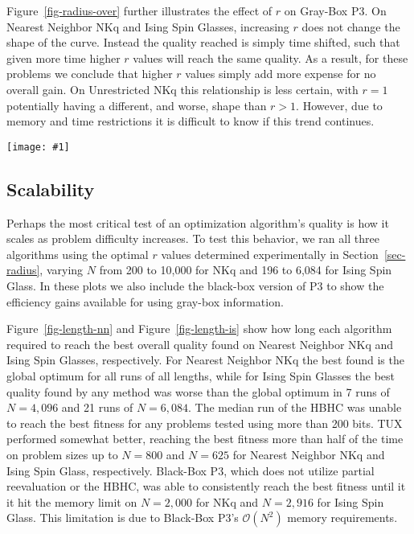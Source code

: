 \documentclass{sig-alternate}
\newcommand{\includegraphicswide}[1]
{\texttt{[image: \#1]}}
\newcommand{\BigO}[1]{$\mathcal{O}{(#1)}$}
\begin{document}
Figure~\ref{fig-radius-over} further illustrates the effect of $r$ on Gray-Box P3. On Nearest Neighbor NKq
and Ising Spin Glasses, increasing $r$ does not change the shape of the curve. Instead the quality reached is simply time shifted,
such that given more time higher $r$ values will reach the same quality. As a result, for these problems we conclude
that higher $r$ values simply add more expense for no overall gain.
On Unrestricted NKq this relationship is less certain, with $r=1$ potentially having a different, and worse, shape than $r>1$.
However, due to memory and time restrictions it is difficult to know if this trend continues.

\begin{figure*}
  \centering
  \includegraphicswide{radius-over}
  \caption{Comparison of Gray-Box P3's solution quality during optimization on a log-log scale for different $r$ values.
  For NKq-Landscapes $N=6,000$ and $K=4$ and for Ising Spin Glasses $N=6,084$.}
  \label{fig-radius-over}
\end{figure*}

\subsection{Scalability}
Perhaps the most critical test of an optimization algorithm's quality is
how it scales as problem difficulty increases. To test this behavior,
we ran all three algorithms using the optimal $r$ values determined experimentally in Section~\ref{sec-radius},
varying $N$ from 200 to 10,000 for NKq and 196 to 6,084 for Ising Spin Glass.
In these plots we also include the black-box version of P3 to show the efficiency
gains available for using gray-box information.


Figure~\ref{fig-length-nn} and Figure~\ref{fig-length-is} show how long each
algorithm required to reach the best overall quality found on Nearest Neighbor NKq
and Ising Spin Glasses, respectively. For Nearest Neighbor NKq the best found
is the global optimum for all runs of all lengths, while for Ising Spin Glasses
the best quality found by any method was worse than the global optimum in 7 runs of
$N=4,096$ and 21 runs of $N=6,084$. The median run of the HBHC was unable to reach the best fitness
for any problems tested using more than 200 bits. TUX performed somewhat better, reaching
the best fitness more than half of the time on problem sizes up to $N=800$ and $N=625$ for Nearest Neighbor NKq and Ising
Spin Glass, respectively. Black-Box P3, which does not utilize partial reevaluation or the HBHC,
was able to consistently reach the best fitness until it it hit the memory limit on $N=2,000$ for
NKq and $N=2,916$ for Ising Spin Glass. This limitation is due to Black-Box P3's
\BigO{N^2} memory requirements.
\end{document}
